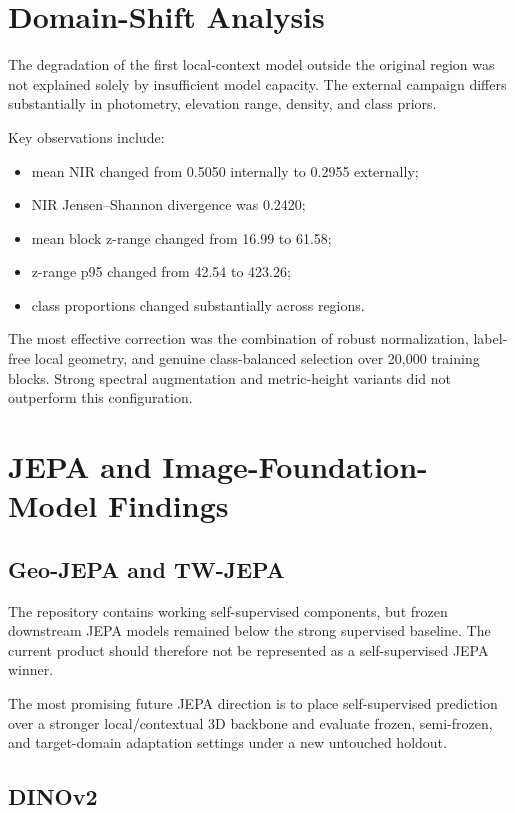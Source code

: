 \documentclass[11pt,a4paper]{article}
\begin{document}
\section{Domain-Shift Analysis}

The degradation of the first local-context model outside the original region was not explained solely by insufficient model capacity. The external campaign differs substantially in photometry, elevation range, density, and class priors.

Key observations include:

\begin{itemize}
  \item mean NIR changed from 0.5050 internally to 0.2955 externally;
  \item NIR Jensen--Shannon divergence was 0.2420;
  \item mean block z-range changed from 16.99 to 61.58;
  \item z-range p95 changed from 42.54 to 423.26;
  \item class proportions changed substantially across regions.
\end{itemize}

The most effective correction was the combination of robust normalization, label-free local geometry, and genuine class-balanced selection over 20,000 training blocks. Strong spectral augmentation and metric-height variants did not outperform this configuration.

\section{JEPA and Image-Foundation-Model Findings}

\subsection{Geo-JEPA and TW-JEPA}

The repository contains working self-supervised components, but frozen downstream JEPA models remained below the strong supervised baseline. The current product should therefore not be represented as a self-supervised JEPA winner.

The most promising future JEPA direction is to place self-supervised prediction over a stronger local/contextual 3D backbone and evaluate frozen, semi-frozen, and target-domain adaptation settings under a new untouched holdout.

\subsection{DINOv2}
\end{document}
